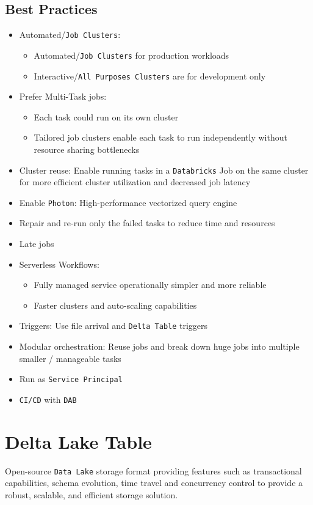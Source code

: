 \documentclass[11pt]{scrartcl}
\begin{document}
\subsection{Best Practices}
\begin{itemize}
	\item Automated/\texttt{Job Clusters}:
	\begin{itemize}
		\item Automated/\texttt{Job Clusters} for production workloads
		\item Interactive/\texttt{All Purposes Clusters} are for development only
	\end{itemize}
	\item Prefer Multi-Task jobs:
	\begin{itemize}
		\item Each task could run on its own cluster
		\item Tailored job clusters enable each task to run independently without resource sharing bottlenecks
	\end{itemize}
	\item Cluster reuse: Enable running tasks in a \texttt{Databricks} Job on the same cluster for more efficient cluster utilization and decreased job latency
	\item Enable \texttt{Photon}: High-performance vectorized query engine
	\item Repair and re-run only the failed tasks to reduce time and resources
	\item Late jobs
	\item Serverless Workflows:
	\begin{itemize}
		\item Fully managed service operationally simpler and more reliable
		\item Faster clusters and auto-scaling capabilities
	\end{itemize}
	\item Triggers: Use file arrival and \texttt{Delta Table} triggers
	\item Modular orchestration: Reuse jobs and break down huge jobs into multiple smaller / manageable tasks
	\item Run as \texttt{Service Principal}
	\item \texttt{CI/CD} with \texttt{DAB}
\end{itemize}


\section{Delta Lake Table} \label{delta_lake_table}
Open-source \texttt{Data Lake} storage format providing features such as transactional capabilities, schema evolution, time travel and concurrency control to provide a robust, scalable, and efficient storage solution.
\end{document}
